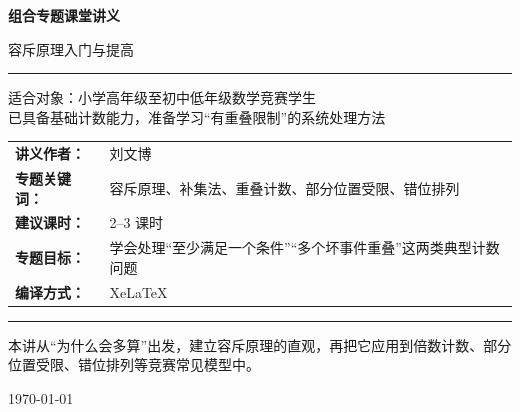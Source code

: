 \documentclass[11pt,a4paper,fontset=fandol]{ctexart}
\theoremstyle{formaltheorem}
\theoremstyle{formalexample}
\begin{document}
\thispagestyle{empty}
\begin{titlepage}
\centering
\vspace*{0.9cm}

\begin{tcolorbox}[
  enhanced,
  width=0.92\textwidth,
  colback=white,
  colframe=mainblue,
  boxrule=1pt,
  arc=0mm,
  left=6mm,
  right=6mm,
  top=8mm,
  bottom=8mm
]
\centering

{\fontsize{24}{30}\selectfont\bfseries 组合专题课堂讲义\par}
\vspace{0.7cm}
{\fontsize{17}{22}\selectfont 容斥原理入门与提高\par}

\vspace{1.1cm}
\color{rulegray}\rule{0.72\textwidth}{0.7pt}\par
\vspace{1cm}

\begin{tcolorbox}[colback=lightblue,colframe=mainblue,width=0.82\textwidth,boxrule=1pt]
\centering
{\Large 适合对象：小学高年级至初中低年级数学竞赛学生}\\[0.4em]
{\large 已具备基础计数能力，准备学习“有重叠限制”的系统处理方法}
\end{tcolorbox}

\vspace{1.2cm}

\renewcommand{\arraystretch}{1.42}
\begin{tabular}{>{\bfseries}p{3.5cm}p{8cm}}
讲义作者： & 刘文博 \\
专题关键词： & 容斥原理、补集法、重叠计数、部分位置受限、错位排列 \\
建议课时： & 2--3 课时 \\
专题目标： & 学会处理“至少满足一个条件”“多个坏事件重叠”这两类典型计数问题 \\
编译方式： & XeLaTeX \\
\end{tabular}

\vspace{1.2cm}
\color{rulegray}\rule{0.72\textwidth}{0.7pt}\par
\vspace{0.8cm}

{\normalsize 本讲从“为什么会多算”出发，建立容斥原理的直观，再把它应用到倍数计数、部分位置受限、错位排列等竞赛常见模型中。\par}

\vspace{0.5cm}
{\large \today\par}
\end{tcolorbox}
\end{titlepage}
\end{document}
